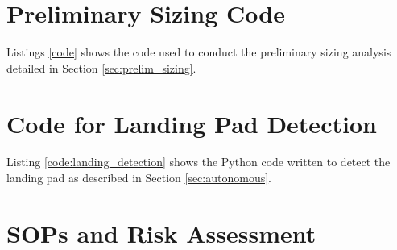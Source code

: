 \begin{appendices}
\newpage

% 

\newpage


\section{Preliminary Sizing Code}
\label{appendixcalcs}

Listings \ref{code} shows the code used to conduct the preliminary sizing analysis detailed in Section \ref{sec:prelim_sizing}.



\newpage

\section{Code for Landing Pad Detection}

Listing \ref{code:landing_detection} shows the Python code written to detect the landing pad as described in Section \ref{sec:autonomous}.



\section{SOPs and Risk Assessment}


\end{appendices}
